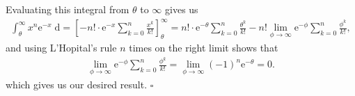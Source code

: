 \documentclass[10pt]{article}
\begin{document}
Evaluating this integral from \(\theta\) to \(\infty\) gives us 
\begin{align*}
    \int_{\theta}^{\infty} x^n \mathrm{e}^{-x} \;\mathrm{d} 
    = \left[ -n! \cdot \mathrm{e}^{-x} \sum_{k=0}^n \frac{x^k}{k!} \right]_{\theta}^{\infty}
    = n! \cdot \mathrm{e}^{-\theta} \sum_{k=0}^n \frac{\theta^k}{k!} - n! \lim_{\phi \to \infty} \mathrm{e}^{-\phi} \sum_{k=0}^n \frac{\phi^k}{k!},
\end{align*}
and using L'Hopital's rule \(n\) times on the right limit shows that 
\begin{align*}
    \lim_{\phi \to \infty} \mathrm{e}^{-\phi} \sum_{k=0}^n \frac{\phi^k}{k!} = \lim_{\phi \to \infty} (-1)^n \mathrm{e}^{-\theta} = 0.
\end{align*}
which gives us our desired result. \hfill \(\square\)
\end{document}
